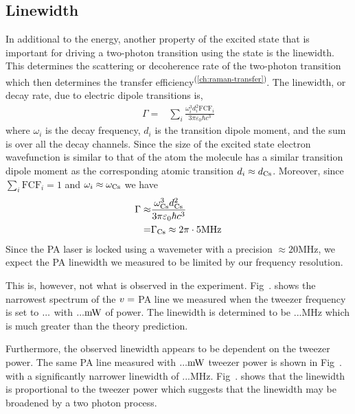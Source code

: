 \subsection{Linewidth}
\label{pa:linewidth}

In additional to the energy, another property of the excited state
that is important for driving a two-photon transition using the state is the linewidth.
This determines the scattering or decoherence rate of
the two-photon transition which then determines
the transfer efficiency\textsuperscript{(\ref{ch:raman-transfer})}.
The linewidth, or decay rate, due to electric dipole transitions is,
\begin{align*}
  \Gamma=&\sum_{i}\frac{\omega_i^3d_i^2\mathrm{FCF}_i}{3\pi\varepsilon_0\hbar c^3}
\end{align*}
where $\omega_i$ is the decay frequency, $d_i$ is the transition dipole moment,
and the sum is over all the decay channels.
Since the size of the excited state electron wavefunction is similar to that of the atom
the molecule has a similar transition dipole moment as the corresponding atomic transition
$d_i\approx d_\Cs$. Moreover, since $\sum_i\mathrm{FCF}_i=1$ and $\omega_i\approx\omega_\Cs$
we have
\begin{align*}
  \Gamma\approx&\frac{\omega_\Cs^3d_\Cs^2}{3\pi\varepsilon_0\hbar c^3}\\
  =&\Gamma_\Cs\approx2\pi\cdot5\mathrm{MHz}
\end{align*}
Since the PA laser is locked using a wavemeter with a precision
$\approx20\mathrm{MHz}$, we expect the PA linewidth we measured to be limited
by our frequency resolution.

This is, however, not what is observed in the experiment.
Fig~.\todo{\ref{}} shows the narrowest spectrum of the $v=\todo{number}$ PA line
we measured when the tweezer frequency is set to $...\todo{}$
with $...\todo{} \mathrm{mW}$ of power. The linewidth is determined to be $... \mathrm{MHz}$
which is much greater than the theory prediction.

Furthermore, the observed linewidth appears to be dependent on the tweezer power.
The same PA line measured with $...\todo{} \mathrm{mW}$ tweezer power
is shown in Fig~.\todo{\ref{}} with a significantly narrower linewidth
of $... \mathrm{MHz}$.
Fig~.\todo{\ref{}} shows that the linewidth is proportional to the tweezer power
which suggests that the linewidth may be broadened by a two photon process.

